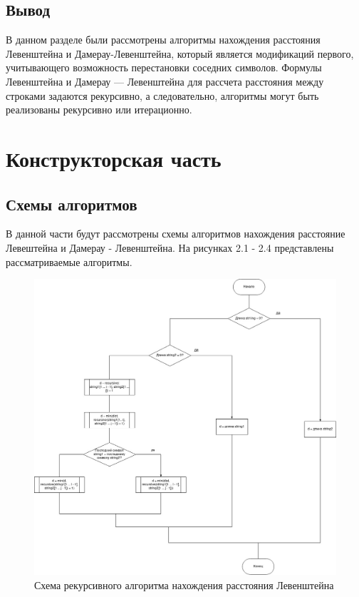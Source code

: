 \documentclass[12pt]{report}
\begin{document}
\section{Вывод}
	В данном разделе были рассмотрены алгоритмы нахождения расстояния Левенштейна и Дамерау-Левенштейна, который является модификаций первого, учитывающего возможность перестановки соседних символов. Формулы Левенштейна и Дамерау — Левенштейна для рассчета расстояния между строками задаются рекурсивно, а следовательно, алгоритмы могут быть реализованы рекурсивно или итерационно.
	
\clearpage

\chapter{Конструкторская часть}

\section{Схемы алгоритмов}
В данной части будут рассмотрены схемы алгоритмов нахождения расстояние Левештейна и Дамерау - Левенштейна. На рисунках 2.1 - 2.4 представлены рассматриваемые алгоритмы.

\begin{figure}[h]
	\centering
	\includegraphics[width=0.75\linewidth]{rec.jpg}
	\caption{Схема рекурсивного алгоритма нахождения расстояния Левенштейна}
	\label{fig:mpr}
\end{figure}
\end{document}
